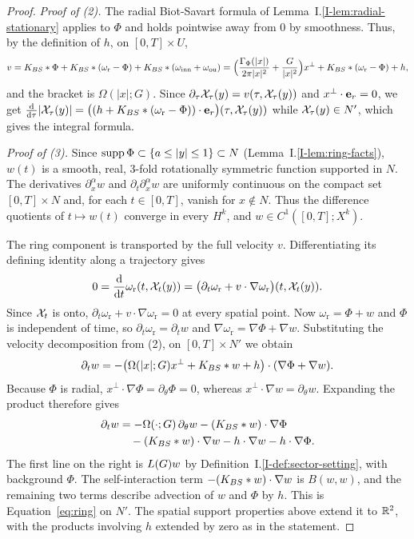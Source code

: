 \begin{proof}
\emph{Proof of (2).} The radial Biot-Savart formula of
Lemma~I.\ref{I-lem:radial-stationary} applies to $\Phi$ and holds pointwise
away from $0$ by smoothness. Thus, by the definition of $h$, on $[0,T]\times U$,
\[
v=K_{BS}\ast\Phi+K_{BS}\ast(\omega_{\mathrm r}-\Phi)+K_{BS}\ast(\omega_{\mathrm{inn}}+\omega_{\mathrm{ou}})
=\Big(\frac{\Gamma_\Phi(|x|)}{2\pi|x|^2}+\frac G{|x|^2}\Big)x^\perp+K_{BS}\ast(\omega_{\mathrm r}-\Phi)+h,
\]
and the bracket is $\Omega(|x|;G)$. Since $\partial_\tau\mathcal{X}_\tau(y)=v(\tau,\mathcal{X}_\tau(y))$
and $x^\perp\cdot\textbf{e}_r=0$, we get $\frac{\dd}{\dd\tau}|\mathcal{X}_\tau(y)|=
\big((h+K_{BS}\ast(\omega_{\mathrm r}-\Phi))\cdot\textbf{e}_r\big)(\tau,\mathcal{X}_\tau(y))$ while
$\mathcal{X}_\tau(y)\in N'$, which gives the integral formula.

\emph{Proof of (3).} Since $\operatorname{supp}\Phi\subset\{a\le|y|\le1\}\subset N$
(Lemma~I.\ref{I-lem:ring-facts}), $w(t)$ is a smooth, real, $3$-fold rotationally symmetric function
supported in $N$. The derivatives $\partial^\alpha_xw$ and
$\partial_t\partial^\alpha_xw$ are uniformly continuous on the compact set
$[0,T]\times N$ and, for each $t\in[0,T]$, vanish for $x\notin N$.
Thus the difference quotients of
$t\mapsto w(t)$ converge in every $H^k$, and $w\in C^1([0,T];X^k)$.

The ring component is transported by the full velocity $v$. Differentiating
its defining identity along a trajectory gives
\[
0=\frac{\dd}{\dd t}\omega_{\mathrm r}(t,\mathcal{X}_t(y))
=\big(\partial_t\omega_{\mathrm r}+v\cdot\nabla\omega_{\mathrm r}\big)(t,\mathcal{X}_t(y)).
\]
Since $\mathcal{X}_t$ is onto, $\partial_t\omega_{\mathrm r}
+v\cdot\nabla\omega_{\mathrm r}=0$ at every spatial point.
Now $\omega_{\mathrm r}=\Phi+w$ and $\Phi$ is independent of time, so
$\partial_t\omega_{\mathrm r}=\partial_tw$ and
$\nabla\omega_{\mathrm r}=\nabla\Phi+\nabla w$.
Substituting the velocity decomposition from (2), on $[0,T]\times N'$ we obtain
\[
\partial_tw=-\big(\Omega(|x|;G)x^\perp+K_{BS}\ast w+h\big)
\cdot(\nabla\Phi+\nabla w).
\]
Because $\Phi$ is radial,
$x^\perp\cdot\nabla\Phi=\partial_\theta\Phi=0$, whereas
$x^\perp\cdot\nabla w=\partial_\theta w$. Expanding the product therefore gives
\[
\begin{aligned}
\partial_tw
&=-\Omega(\cdot;G)\,\partial_\theta w-(K_{BS}\ast w)\cdot\nabla\Phi\\
&\quad-(K_{BS}\ast w)\cdot\nabla w-h\cdot\nabla w-h\cdot\nabla\Phi.
\end{aligned}
\]
The first line on the right is $L(G)w$ by
Definition~I.\ref{I-def:sector-setting}, with background $\Phi$.
The self-interaction term $-(K_{BS}\ast w)\cdot\nabla w$ is $B(w,w)$, and
the remaining two terms describe advection of $w$ and $\Phi$ by $h$.
This is Equation~\eqref{eq:ring} on $N'$. The spatial support properties
above extend it to $\mathbb{R}^2$, with the products involving $h$ extended by zero
as in the statement.
\end{proof}

